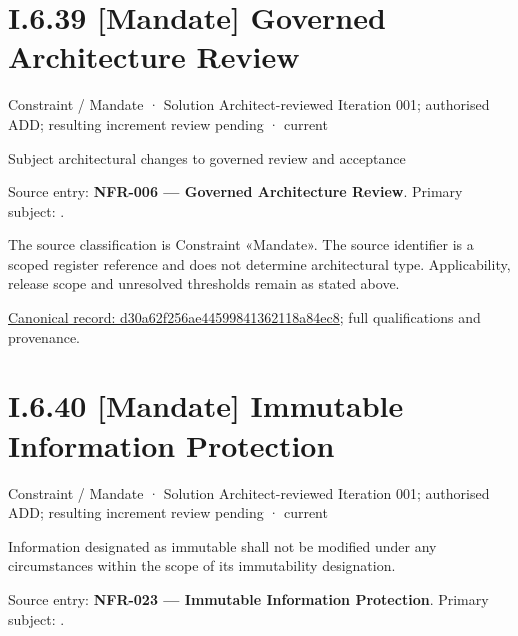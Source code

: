 \section*{I.6.39 [Mandate] Governed Architecture Review}
\label{navigation:I.6.39}

\label{element:d30a62f256ae44599841362118a84ec8}
{\small Constraint / Mandate · Solution Architect-reviewed Iteration 001; authorised ADD; resulting increment review pending · current}\par

Subject architectural changes to governed review and acceptance



Source entry: \textbf{NFR-006 — Governed Architecture Review}. Primary subject: \texttt{}.



The source classification is Constraint «Mandate». The source identifier is a scoped register reference and does not determine architectural type. Applicability, release scope and unresolved thresholds remain as stated above.


{\footnotesize \href{../../../../../../../../continuum/motivation/constraint/mandate/d30a62f256ae44599841362118a84ec8.md}{Canonical record: d30a62f256ae44599841362118a84ec8}; full qualifications and provenance.}\par
\section*{I.6.40 [Mandate] Immutable Information Protection}
\label{navigation:I.6.40}

\label{element:4a25d9c8aaa9418fbddb5bff7302c46d}
{\small Constraint / Mandate · Solution Architect-reviewed Iteration 001; authorised ADD; resulting increment review pending · current}\par

Information designated as immutable shall not be modified under any circumstances within the scope of its immutability designation.



Source entry: \textbf{NFR-023 — Immutable Information Protection}. Primary subject: \texttt{}.



